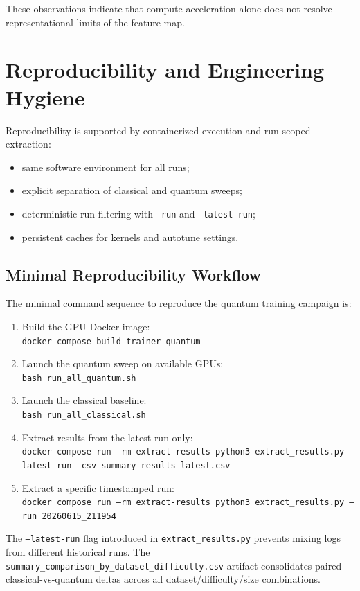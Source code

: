 \documentclass[10pt,twocolumn,letterpaper]{article}
\begin{document}
These observations indicate that compute acceleration alone does not resolve representational limits of the feature map.

\section{Reproducibility and Engineering Hygiene}
Reproducibility is supported by containerized execution and run-scoped extraction:
\begin{itemize}
    \item same software environment for all runs;
    \item explicit separation of classical and quantum sweeps;
    \item deterministic run filtering with \texttt{--run} and \texttt{--latest-run};
    \item persistent caches for kernels and autotune settings.
\end{itemize}

\subsection{Minimal Reproducibility Workflow}
The minimal command sequence to reproduce the quantum training campaign is:
\begin{enumerate}
    \item Build the GPU Docker image:\\{\small\texttt{docker compose build trainer-quantum}}
    \item Launch the quantum sweep on available GPUs:\\{\small\texttt{bash run\_all\_quantum.sh}}
    \item Launch the classical baseline:\\{\small\texttt{bash run\_all\_classical.sh}}
    \item Extract results from the latest run only:\\{\small\texttt{docker compose run --rm extract-results python3 extract\_results.py --latest-run --csv summary\_results\_latest.csv}}
    \item Extract a specific timestamped run:\\{\small\texttt{docker compose run --rm extract-results python3 extract\_results.py --run 20260615\_211954}}
\end{enumerate}

The \texttt{--latest-run} flag introduced in \texttt{extract\_results.py} prevents mixing logs from different historical runs. The \texttt{summary\_comparison\_by\_dataset\_difficulty.csv} artifact consolidates paired classical-vs-quantum deltas across all dataset/difficulty/size combinations.
\end{document}
